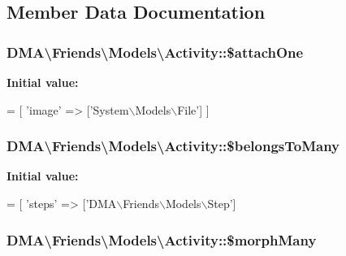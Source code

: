 \subsection{Member Data Documentation}
\hypertarget{classDMA_1_1Friends_1_1Models_1_1Activity_a9911cb733cbc863cc1bdccde254404b5}{
\subsubsection[{\$attach\+One}]{\setlength{\rightskip}{0pt plus 5cm}D\+M\+A\textbackslash{}\+Friends\textbackslash{}\+Models\textbackslash{}\+Activity\+::\$attach\+One}}\label{classDMA_1_1Friends_1_1Models_1_1Activity_a9911cb733cbc863cc1bdccde254404b5}
{\bfseries Initial value\+:}
\begin{DoxyCode}
= [
        \textcolor{stringliteral}{'image'} => [\textcolor{stringliteral}{'System\(\backslash\)Models\(\backslash\)File'}]
    ]
\end{DoxyCode}
\hypertarget{classDMA_1_1Friends_1_1Models_1_1Activity_ae5245e6eb74228cd54d8ae77e5a9bb38}{
\subsubsection[{\$belongs\+To\+Many}]{\setlength{\rightskip}{0pt plus 5cm}D\+M\+A\textbackslash{}\+Friends\textbackslash{}\+Models\textbackslash{}\+Activity\+::\$belongs\+To\+Many}}\label{classDMA_1_1Friends_1_1Models_1_1Activity_ae5245e6eb74228cd54d8ae77e5a9bb38}
{\bfseries Initial value\+:}
\begin{DoxyCode}
= [
        \textcolor{stringliteral}{'steps'}         => [\textcolor{stringliteral}{'DMA\(\backslash\)Friends\(\backslash\)Models\(\backslash\)Step'}]
\end{DoxyCode}
\hypertarget{classDMA_1_1Friends_1_1Models_1_1Activity_a192fdaacf609961b7a436d2b967dfd60}{
\subsubsection[{\$morph\+Many}]{\setlength{\rightskip}{0pt plus 5cm}D\+M\+A\textbackslash{}\+Friends\textbackslash{}\+Models\textbackslash{}\+Activity\+::\$morph\+Many}}\label{classDMA_1_1Friends_1_1Models_1_1Activity_a192fdaacf609961b7a436d2b967dfd60}
